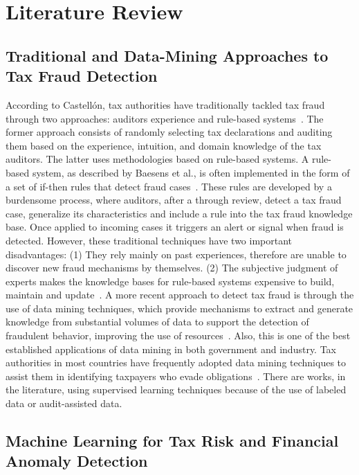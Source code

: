 \section{Literature Review}

\subsection{Traditional and Data-Mining Approaches to Tax Fraud Detection}

According to Castellón, tax authorities have traditionally tackled tax fraud through two approaches: auditors experience and rule-based systems~\cite{gonzalez2013characterization}. The former approach consists of randomly selecting tax declarations and auditing them based on the experience, intuition, and domain knowledge of the tax auditors. The latter uses methodologies based on rule-based systems. A rule-based system, as described by Baesens et al., is often implemented in the form of a set of if-then rules that detect fraud cases~\cite{baesens2015fraud}. These rules are developed by a burdensome process, where auditors, after a through review, detect a tax fraud case, generalize its characteristics and include a rule into the tax fraud knowledge base. Once applied to incoming cases it triggers an alert or signal when fraud is detected. However, these traditional techniques have two important disadvantages: (1) They rely mainly on past experiences, therefore are unable to discover new fraud mechanisms by themselves. (2) The subjective judgment of experts makes the knowledge bases for rule-based systems expensive to build, maintain and update~\cite{baesens2015fraud}. A more recent approach to detect tax fraud is through the use of data mining techniques, which provide mechanisms to extract and generate knowledge from substantial volumes of data to support the detection of fraudulent behavior, improving the use of resources~\cite{gonzalez2013characterization}. Also, this is one of the best established applications of data mining in both government and industry. Tax authorities in most countries have frequently adopted data mining techniques to assist them in identifying taxpayers who evade obligations~\cite{gonzalez2013characterization}. There are works, in the literature, using supervised learning techniques because of the use of labeled data or audit-assisted data.

\subsection{Machine Learning for Tax Risk and Financial Anomaly Detection}

